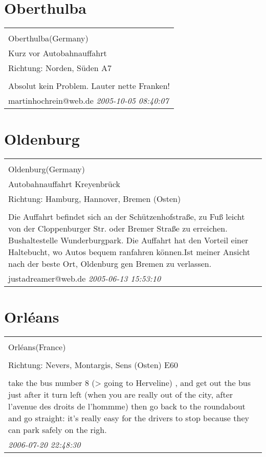 \documentclass[a4paper,12pt]{article}
\begin{document}
\section{Oberthulba}
\begin{tabular}{|p{13cm}|}
\hline\\
Oberthulba(Germany)\\
Kurz vor Autobahnauffahrt\\
Richtung: Norden, Süden A7 \\
\hline\\
Absolut kein Problem. Lauter nette Franken! \\
martinhochrein@web.de \textit{ 2005-10-05 08:40:07 }\\\hline
\end{tabular}


\section{Oldenburg}
\begin{tabular}{|p{13cm}|}
\hline\\
Oldenburg(Germany)\\
Autobahnauffahrt Kreyenbrück\\
Richtung: Hamburg, Hannover, Bremen (Osten) \\
\hline\\
Die Auffahrt befindet sich an der Schützenhofstraße, zu Fuß leicht von der Cloppenburger Str. oder Bremer Straße zu erreichen. Bushaltestelle Wunderburgpark. Die Auffahrt hat den Vorteil einer Haltebucht, wo Autos bequem ranfahren können.Ist meiner Ansicht nach der beste Ort, Oldenburg gen Bremen zu verlassen. \\
justadreamer@web.de \textit{ 2005-06-13 15:53:10 }\\\hline
\end{tabular}


\section{Orléans}
\begin{tabular}{|p{13cm}|}
\hline\\
Orléans(France)\\
\\
Richtung: Nevers, Montargis, Sens (Osten) E60 \\
\hline\\
take the bus number 8 (> going to Herveline) , and get out the bus just after it turn left (when you are really out of the city, after l'avenue des droits de l'hommme) then go back to the roundabout and go straight: it's really easy for the drivers to stop because they can park safely on the righ. \\
\textit{ 2006-07-20 22:48:30 }\\\hline
\end{tabular}
\end{document}
